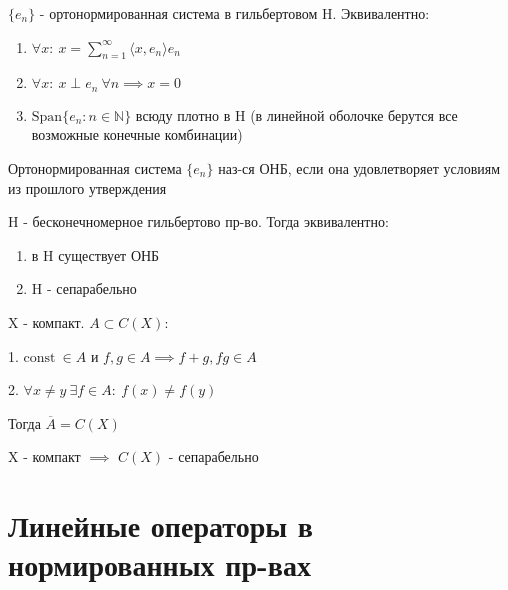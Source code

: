 \documentclass[a4paper,12pt]{article}
\begin{document}
\begin{claim*}
$\{e_n\}$ - ортонормированная система в гильбертовом H. Эквивалентно:
\begin{enumerate}
    \item $\forall x : \ x = \sum\limits_{n=1}^{\infty} \langle x, e_n \rangle e_n$
    \item $\forall x : \ x \perp e_n \ \forall n \implies x = 0$
    \item $\text{Span} \{ e_n : n \in \mathbb{N} \} $ всюду плотно в H (в линейной оболочке берутся все возможные конечные комбинации)
\end{enumerate}
\end{claim*}

\begin{definition*}
Ортонормированная система $\{e_n\}$ наз-ся ОНБ, если она удовлетворяет условиям из прошлого утверждения
\end{definition*}

\begin{theorem*}
H - бесконечномерное гильбертово пр-во. Тогда эквивалентно:
\begin{enumerate}
    \item в H существует ОНБ
    \item H - сепарабельно
\end{enumerate}
\end{theorem*}

\begin{theorem*}
X - компакт. $A \subset C(X)$:

1. $\text{const} \ \in A$ и $f, g \in A \implies f + g, fg \in A$

2. $\forall x \neq y \ \exists f \in A : \ f(x) \neq f(y)$

Тогда $\overline{A} = C(X)$
\end{theorem*}

\begin{corollary*}
X - компакт $\implies$ $C(X)$ - сепарабельно
\end{corollary*}










\vspace{2cm}

\section{Линейные операторы в нормированных пр-вах}
\end{document}
